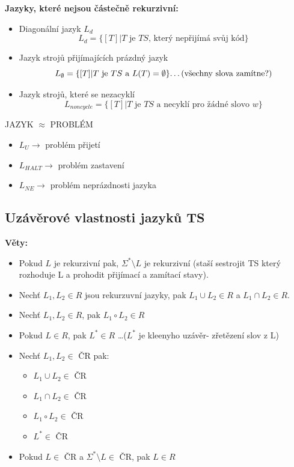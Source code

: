 \documentclass[10pt,a4paper]{article}
\theoremstyle{note}
\begin{document}
		\textbf{Jazyky, které nejsou částečně rekurzivní:}

		\begin{itemize}
			\item Diagonální jazyk $L_{d}$ $$L_{d} = \{[T]| T \text{ je } TS \text{, který nepřijímá svůj kód} \}$$
			\item Jazyk strojů přijímajících prázdný jazyk
				$$L_{\emptyset} = \{[T]| T \text{ je } TS \text{ a } L(T) =
						\emptyset \} \text{\dots(všechny slova zamítne?)}$$
			\item Jazyk strojů, které se nezacyklí
				$$L_{noncycle} = \{ [T]| T \text{ je } TS \text{ a necyklí pro žádné slovo } w\}$$
		\end{itemize}

		\vspace{1cm}
		JAZYK $\approx$ PROBLÉM

		\begin{itemize}
			\item $L_{U} \rightarrow$ problém přijetí
			\item $L_{HALT} \rightarrow$ problém zastavení
			\item $L_{NE} \rightarrow$ problém neprázdnosti jazyka
		\end{itemize}
		\vspace{1cm}


	\subsection{Uzávěrové vlastnosti jazyků TS}

	\textbf{Věty:}
		\begin{itemize}
			\item Pokud $L$ je rekurzivní pak, $\Sigma^{*} \setminus  L$ je rekurzivní (staší sestrojit TS který rozhoduje L
				a prohodit přijímací a zamítací stavy).
			\item Nechť $L_{1}, L_{2} \in R$ jsou rekurzuvní jazyky, pak $L_{1} \cup L_{2} \in R$  a  $L_{1} \cap L_{2} \in R$.
			\item Nechť $L_{1},L_{2} \in R$, pak $L_{1} \circ  L_{2}\in R$
			\item Pokud $L \in R$, pak $L^{*} \in R$ \dots($L^{*}$ je kleenyho uzávěr- zřetězení slov z L)



			\item Nechť $L_{1}, L_{2} \in$ ČR pak:
				\begin{itemize}
					\item $L_{1} \cup L_{2} \in$ ČR
					\item $L_{1} \cap L_{2} \in$ ČR
					\item $L_{1} \circ L_{2} \in$ ČR
					\item $L^{*} \in $ ČR
				\end{itemize}
			\item Pokud $L \in $ ČR a  $\Sigma^{*} \setminus  L \in $ ČR, pak $L \in R$

		\end{itemize}
\end{document}
